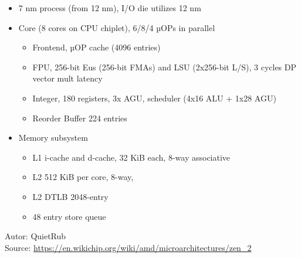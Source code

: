 \documentclass{beamer}
\begin{document}
\begin{frame}
\begin{columns}[T]
\begin{column}{0.66\textwidth}
\scriptsize
\begin{itemize}
\item 7 nm process (from 12 nm), I/O die utilizes 12 nm
\item Core (8 cores on CPU chiplet),  6/8/4 µOPs in parallel
\begin{itemize}
\scriptsize
\item Frontend, µOP cache (4096 entries)
\item FPU, 256-bit Eus (256-bit FMAs) and LSU (2x256-bit L/S), 3 cycles DP vector mult latency
\item Integer, 180 registers, 3x AGU, scheduler (4x16 ALU + 1x28 AGU)
\item Reorder Buffer 224 entries
\end{itemize}
\item Memory subsystem
\begin{itemize}
\scriptsize
\item L1 i-cache and d-cache, 32 KiB each,  8-way associative
\item L2 512 KiB per core, 8-way, 
\item L2 DTLB 2048-entry
\item 48 entry store queue
\end{itemize}
\end{itemize}
Autor: QuietRub\\
Source: \url{https://en.wikichip.org/wiki/amd/microarchitectures/zen_2}
\end{column}
\end{columns}

\end{frame}
\end{document}
